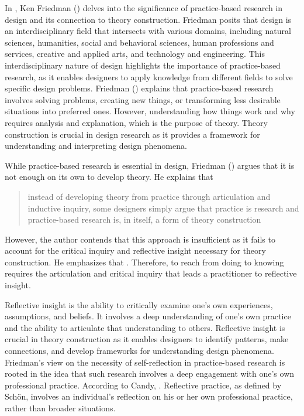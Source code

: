In , Ken Friedman (\citeyear{Friedman2003}) delves into the significance of practice-based research in design and its connection to theory construction. Friedman posits that design is an interdisciplinary field that intersects with various domains, including natural sciences, humanities, social and behavioral sciences, human professions and services, creative and applied arts, and technology and engineering. This interdisciplinary nature of design highlights the importance of practice-based research, as it enables designers to apply knowledge from different fields to solve specific design problems. Friedman (\citeyear{Friedman2003}) explains that practice-based research involves solving problems, creating new things, or transforming less desirable situations into preferred ones. However, understanding how things work and why requires analysis and explanation, which is the purpose of theory. Theory construction is crucial in design research as it provides a framework for understanding and interpreting design phenomena.

While practice-based research is essential in design, Friedman (\citeyear{Friedman2003}) argues that it is not enough on its own to develop theory. He explains that \blockcquote[p. 519]{Friedman2003}{instead of developing theory from practice through articulation and inductive inquiry, some designers simply argue that practice is research and practice-based research is, in itself, a form of theory construction}. However, the author contends that this approach is insufficient as it fails to account for the critical inquiry and reflective insight necessary for theory construction.
He emphasizes that . Therefore, to reach from doing to knowing requires the articulation and critical inquiry that leads a practitioner to reflective insight.

Reflective insight is the ability to critically examine one's own experiences, assumptions, and beliefs. It involves a deep understanding of one's own practice and the ability to articulate that understanding to others. Reflective insight is crucial in theory construction as it enables designers to identify patterns, make connections, and develop frameworks for understanding design phenomena. Friedman's view on the necessity of self-reflection in practice-based research is rooted in the idea that such research involves a deep engagement with one's own professional practice. According to Candy, . Reflective practice, as defined by Schön, involves an individual's reflection on his or her own professional practice, rather than broader situations.

